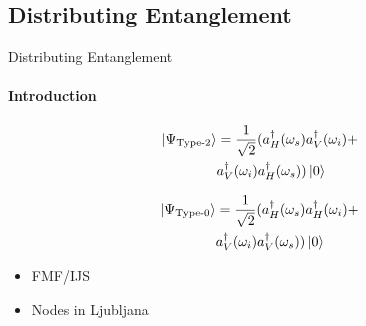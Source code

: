 \documentclass[serif,8pt]{beamer}
\begin{document}
\begin{frame}
\begin{columns}[t]
    \end{columns}
\end{frame}

\subsection{Distributing Entanglement}
\begin{frame}{Distributing Entanglement}
	\framesubtitle{Introduction}
	\begin{minipage}[l]{0.48\textwidth}
		\begin{equation*}
		\begin{aligned}
			\ket{\Psi_{\text{Type-2}}} &= \frac{1}{\sqrt{2}}(a_{H}^{\dagger}(\omega_s)a_{V}^{\dagger}(\omega_i)+\\
								&a_{V}^{\dagger}(\omega_i)a_{H}^{\dagger}(\omega_s))\ket{0}\\
		\end{aligned}
		\end{equation*}
	\end{minipage}
	\begin{minipage}[r]{0.48\textwidth}
	\begin{equation*}
		\begin{aligned}
			\ket{\Psi_{\text{Type-0}}} &= \frac{1}{\sqrt{2}}(a_{H}^{\dagger}(\omega_s)a_{H}^{\dagger}(\omega_i)+\\
									   &a_{V}^{\dagger}(\omega_i)a_{V}^{\dagger}(\omega_s))\ket{0}
		\end{aligned}
	\end{equation*}
	\end{minipage}
	\begin{itemize}
		\item FMF/IJS
		\item Nodes in Ljubljana %
	\end{itemize}
\end{frame}
\end{document}
